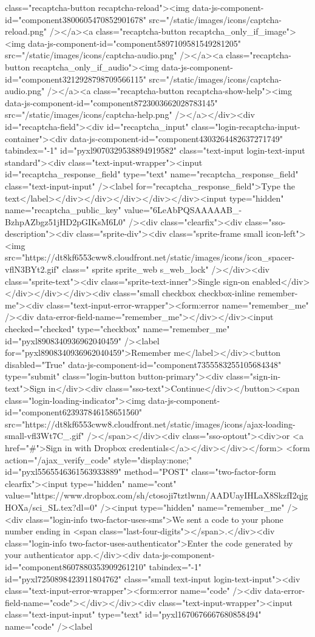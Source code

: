 {class="recaptcha-button recaptcha-reload"><img data-js-component-id="component3800605470852901678" src="/static/images/icons/captcha-reload.png" /></a><a class="recaptcha-button recaptcha_only_if_image"><img data-js-component-id="component5897109581549281205" src="/static/images/icons/captcha-audio.png" /></a><a class="recaptcha-button recaptcha_only_if_audio"><img data-js-component-id="component3212928798709566115" src="/static/images/icons/captcha-audio.png" /></a><a class="recaptcha-button recaptcha-show-help"><img data-js-component-id="component8723003662028783145" src="/static/images/icons/captcha-help.png" /></a></div><div id="recaptcha-field"><div id="recaptcha_input" class="login-recaptcha-input-container"><div data-js-component-id="component4303264482637271749" tabindex="-1" id="pyxl9070329538894919582" class="text-input login-text-input standard"><div class="text-input-wrapper"><input id="recaptcha_response_field" type="text" name="recaptcha_response_field" class="text-input-input" /><label for="recaptcha_response_field">Type the text</label></div></div></div></div></div><input type="hidden" name="recaptcha_public_key" value="6LeAbPQSAAAAAB_-BzhpAZbgz51jHD2pGIKsM6L0" /><div class="clearfix"><div class="sso-description"><div class="sprite-div"><div class="sprite-frame small icon-left"><img src="https://dt8kf6553cww8.cloudfront.net/static/images/icons/icon_spacer-vflN3BYt2.gif" class=" sprite sprite_web s_web_lock" /></div><div class="sprite-text"><div class="sprite-text-inner">Single sign-on enabled</div></div></div></div><div class="small checkbox checkbox-inline remember-me"><div class="text-input-error-wrapper"><form:error name="remember_me" /><div data-error-field-name="remember_me"></div></div><input checked="checked" type="checkbox" name="remember_me" id="pyxl8908340936962040459" /><label for="pyxl8908340936962040459">Remember me</label></div><button disabled="True" data-js-component-id="component7355583255105684348" type="submit" class="login-button button-primary"><div class="sign-in-text">Sign in</div><div class="sso-text">Continue</div></button><span class="login-loading-indicator"><img data-js-component-id="component623937846158651560" src="https://dt8kf6553cww8.cloudfront.net/static/images/icons/ajax-loading-small-vfl3Wt7C_.gif" /></span></div><div class="sso-optout"><div>or <a href="#">Sign in with Dropbox credentials</a></div></div></form> <form action="/ajax_verify_code" style="display:none;" id="pyxl5565546361563933889" method="POST" class="two-factor-form clearfix"><input type="hidden" name="cont" value="https://www.dropbox.com/sh/ctosoji7tztlwnn/AADUayIHLaX8SkzfI2qjgHOXa/sci_SL.tex?dl=0" /><input type="hidden" name="remember_me" /><div class="login-info two-factor-uses-sms">We sent a code to your phone number ending in <span class="last-four-digits"></span>.</div><div class="login-info two-factor-uses-authenticator">Enter the code generated by your authenticator app.</div><div data-js-component-id="component8607880353909261210" tabindex="-1" id="pyxl7250898423911804762" class="small text-input login-text-input"><div class="text-input-error-wrapper"><form:error name="code" /><div data-error-field-name="code"></div></div><div class="text-input-wrapper"><input class="text-input-input" type="text" id="pyxl1670676667680858494" name="code" /><label }
